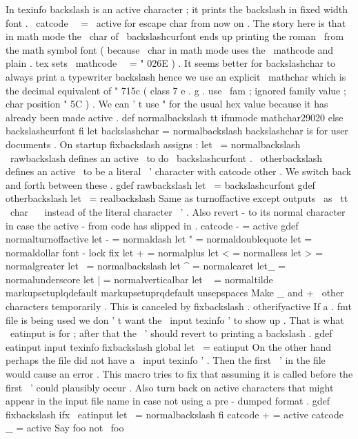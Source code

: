 {{{{%
In
texinfo
backslash
is
an
active
character
;
it
prints
the
backslash
%
in
fixed
width
font
.
\
catcode
\
\
=
\
active
%
for
escape
char
from
now
on
.
%
The
story
here
is
that
in
math
mode
the
\
char
of
\
backslashcurfont
%
ends
up
printing
the
roman
\
from
the
math
symbol
font
(
because
\
char
%
in
math
mode
uses
the
\
mathcode
and
plain
.
tex
sets
%
\
mathcode
\
\
=
"
026E
)
.
It
seems
better
for
backslashchar
{
}
to
always
%
print
a
typewriter
backslash
hence
we
use
an
explicit
\
mathchar
%
which
is
the
decimal
equivalent
of
"
715c
(
class
7
e
.
g
.
use
\
fam
;
%
ignored
family
value
;
char
position
"
5C
)
.
We
can
'
t
use
"
for
the
%
usual
hex
value
because
it
has
already
been
made
active
.
def
normalbackslash
{
{
tt
ifmmode
mathchar29020
else
backslashcurfont
fi
}
}
let
backslashchar
=
normalbackslash
%
backslashchar
{
}
is
for
user
documents
.
%
On
startup
fixbackslash
assigns
:
%
let
\
=
normalbackslash
%
\
rawbackslash
defines
an
active
\
to
do
\
backslashcurfont
.
%
\
otherbackslash
defines
an
active
\
to
be
a
literal
\
'
character
with
%
catcode
other
.
We
switch
back
and
forth
between
these
.
gdef
rawbackslash
{
let
\
=
backslashcurfont
}
gdef
otherbackslash
{
let
\
=
realbackslash
}
%
Same
as
turnoffactive
except
outputs
\
as
{
\
tt
\
char
\
\
}
instead
of
%
the
literal
character
\
'
.
Also
revert
-
to
its
normal
character
in
%
case
the
active
-
from
code
has
slipped
in
.
%
{
catcode
-
=
active
gdef
normalturnoffactive
{
%
let
-
=
normaldash
let
"
=
normaldoublequote
let
=
normaldollar
%
font
-
lock
fix
let
+
=
normalplus
let
<
=
normalless
let
>
=
normalgreater
let
\
=
normalbackslash
let
^
=
normalcaret
let_
=
normalunderscore
let
|
=
normalverticalbar
let
~
=
normaltilde
markupsetuplqdefault
markupsetuprqdefault
unsepspaces
}
}
%
Make
_
and
+
\
other
characters
temporarily
.
%
This
is
canceled
by
fixbackslash
.
otherifyactive
%
If
a
.
fmt
file
is
being
used
we
don
'
t
want
the
\
input
texinfo
'
to
show
up
.
%
That
is
what
\
eatinput
is
for
;
after
that
the
\
'
should
revert
to
printing
%
a
backslash
.
%
gdef
eatinput
input
texinfo
{
fixbackslash
}
global
let
\
=
eatinput
%
On
the
other
hand
perhaps
the
file
did
not
have
a
\
input
texinfo
'
.
Then
%
the
first
\
'
in
the
file
would
cause
an
error
.
This
macro
tries
to
fix
%
that
assuming
it
is
called
before
the
first
\
'
could
plausibly
occur
.
%
Also
turn
back
on
active
characters
that
might
appear
in
the
input
%
file
name
in
case
not
using
a
pre
-
dumped
format
.
%
gdef
fixbackslash
{
%
ifx
\
eatinput
let
\
=
normalbackslash
fi
catcode
+
=
active
catcode
_
=
active
}
%
Say
foo
not
\
foo
}}}}
